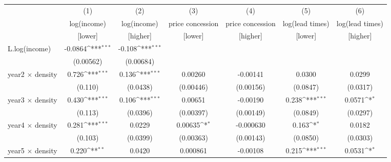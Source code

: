 {
\def\sym#1{\ifmmode^{#1}\else\(^{#1}\)\fi}
\begin{adjustbox}{max width=\textwidth}
\begin{adjustbox}{max width=\textwidth}
\begin{tabular}{l*{6}{c}}
\toprule
            &\multicolumn{1}{c}{(1)}&\multicolumn{1}{c}{(2)}&\multicolumn{1}{c}{(3)}&\multicolumn{1}{c}{(4)}&\multicolumn{1}{c}{(5)}&\multicolumn{1}{c}{(6)}\\
            &\multicolumn{1}{c}{log(income)}&\multicolumn{1}{c}{log(income)}&\multicolumn{1}{c}{price concession}&\multicolumn{1}{c}{price concession}&\multicolumn{1}{c}{log(lead times)}&\multicolumn{1}{c}{log(lead times)}\\
            &\multicolumn{1}{c}{[lower]}&\multicolumn{1}{c}{[higher]}&\multicolumn{1}{c}{[lower]}&\multicolumn{1}{c}{[higher]}&\multicolumn{1}{c}{[lower]}&\multicolumn{1}{c}{[higher]}\\
\midrule
L.log(income) &     -0.0864\sym{***}&      -0.108\sym{***}&                     &                     &                     &                     \\
            &   (0.00562)         &   (0.00684)         &                     &                     &                     &                     \\
\addlinespace
year2 $\times$ density&       0.726\sym{***}&       0.136\sym{***}&     0.00260         &    -0.00141         &      0.0300         &      0.0299         \\
            &     (0.110)         &    (0.0438)         &   (0.00446)         &   (0.00156)         &    (0.0847)         &    (0.0317)         \\
\addlinespace
year3 $\times$ density&       0.430\sym{***}&       0.106\sym{***}&     0.00651         &    -0.00190         &       0.238\sym{***}&      0.0571\sym{*}  \\
            &     (0.113)         &    (0.0396)         &   (0.00397)         &   (0.00149)         &    (0.0849)         &    (0.0297)         \\
\addlinespace
year4 $\times$ density&       0.281\sym{***}&      0.0229         &     0.00635\sym{*}  &   -0.000630         &       0.163\sym{*}  &      0.0182         \\
            &     (0.103)         &    (0.0399)         &   (0.00363)         &   (0.00143)         &    (0.0850)         &    (0.0303)         \\
\addlinespace
year5 $\times$ density&       0.220\sym{**} &      0.0420         &    0.000861         &    -0.00108         &       0.215\sym{***}&      0.0531\sym{*}  \\

\end{tabular}
\end{adjustbox}
\end{adjustbox}}
